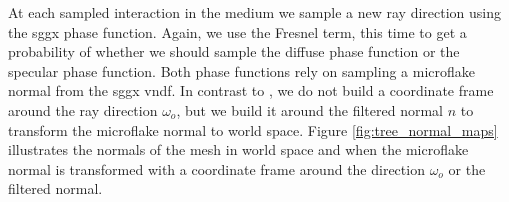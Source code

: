 At each sampled interaction in the medium we sample a new ray direction using the \ac{sggx} phase function.
Again, we use the Fresnel term, this time to get a probability of whether we should sample the diffuse phase function or the specular phase function.
Both phase functions rely on sampling a microflake normal from the \ac{sggx} \acl{vndf}.
In contrast to \citeauthor{sggx} \cite{sggx}, we do not build a coordinate frame around the ray direction $\omega_o$, but we build it around the filtered normal $n$ to transform the microflake normal to world space.
Figure \ref{fig:tree_normal_maps} illustrates the normals of the mesh in world space and when the microflake normal is transformed with a coordinate frame around the direction $\omega_o$ or the filtered normal.
